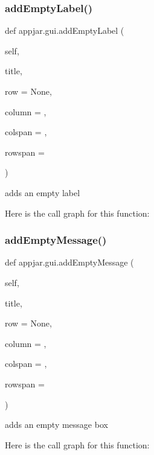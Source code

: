 \subsubsection{\texorpdfstring{add\+Empty\+Label()}{addEmptyLabel()}}
{\footnotesize\ttfamily def appjar.\+gui.\+add\+Empty\+Label (\begin{DoxyParamCaption}\item[{}]{self,  }\item[{}]{title,  }\item[{}]{row = {\ttfamily None},  }\item[{}]{column = {},  }\item[{}]{colspan = {},  }\item[{}]{rowspan = {} }\end{DoxyParamCaption})}

\begin{DoxyVerb}adds an empty label \end{DoxyVerb}
 Here is the call graph for this function\+:
\mbox{\label{classappjar_1_1gui_a706bcec42d6e462a40f8360fcd7130a2}} 
\subsubsection{\texorpdfstring{add\+Empty\+Message()}{addEmptyMessage()}}
{\footnotesize\ttfamily def appjar.\+gui.\+add\+Empty\+Message (\begin{DoxyParamCaption}\item[{}]{self,  }\item[{}]{title,  }\item[{}]{row = {\ttfamily None},  }\item[{}]{column = {},  }\item[{}]{colspan = {},  }\item[{}]{rowspan = {} }\end{DoxyParamCaption})}

\begin{DoxyVerb}adds an empty message box \end{DoxyVerb}
 Here is the call graph for this function\+:
\mbox{\label{classappjar_1_1gui_a216740773803ceef3b97a57b12b3b863}} 
